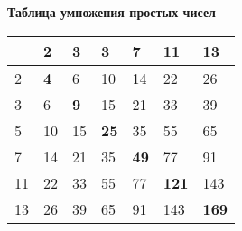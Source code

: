 \documentclass[8pt]{article}
\begin{document}
\thispagestyle{empty}
\begin{landscape}
\centering
\Large \textbf{Таблица умножения простых чисел}

\vspace{1cm}
\begin{tabular}{ ||p{0.5cm} || p{0.5cm}|p{0.5cm}|p{0.5cm}| p{0.5cm}| p{0.5cm}| p{0.5cm}||}
\hline
\hline
 & 2 & 3&3 &7 &11 & 13\\ 
\hline
\hline
2 & \textbf{4} & 6 & 10 & 14 & 22 & 26\\

3 & 6 & \textbf{9} & 15 & 21 & 33 & 39\\

5 & 10 & 15 & \textbf{25} & 35 & 55 & 65\\

7 & 14 & 21 & 35 & \textbf{49} & 77 & 91\\

11 & 22 & 33 & 55 & 77 & \textbf{121} & 143\\

13 & 26 & 39 & 65 & 91 & 143 & \textbf{169}\\
\hline
\hline
\end{tabular}
\end{landscape}
\end{document}
